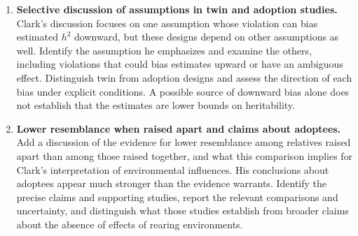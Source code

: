 \documentclass[12pt]{article}
\renewenvironment{itemize}{\begin{enumerate}}{\end{enumerate}}
\begin{document}
\begin{itemize}
from them. Preserve this distinction when assessing both contributions
and limitations.
Often Clark's conclusions do not follow from the evidence he presents.
This does not establish that the conclusions are wrong; it means they
have not been established nearly as credibly as he suggests. Develop
this distinction consistently throughout the review. Working analogy
to consider: his apparent resistance to alternative explanations recalls,
in the opposite direction, the stubbornness of Lysenkoite social
scientists who instinctively reject evidence allowing any role for
genetics. The target is asymmetric standards of evidence, not an
equivalence of substantive views. He also sometimes exaggerates how
strongly his tests discriminate between genetic and cultural models;
symmetry and regression toward the mean are key examples to document.
Examine his claims that school reforms yield no benefits, distinguishing
evidence of no benefit from failure to establish a benefit. Track shifts
between policy criteria: does a reform help anyone or improve average
outcomes, does it help the poor, does it reduce inequality, and does it
increase or reduce mobility? These are distinct questions, and a failure
on one criterion does not establish failure on the others. Collect
specific passages showing where the criterion changes within an argument.
\item \textbf{Selective discussion of assumptions in twin and adoption studies.}
Clark's discussion focuses on one assumption whose violation can bias
estimated $h^2$ downward, but these designs depend on other assumptions
as well. Identify the assumption he emphasizes and examine the others,
including violations that could bias estimates upward or have an
ambiguous effect. Distinguish twin from adoption designs and assess the
direction of each bias under explicit conditions. A possible source of
downward bias alone does not establish that the estimates are lower
bounds on heritability.
\item \textbf{Lower resemblance when raised apart and claims about adoptees.}
Add a discussion of the evidence for lower resemblance among relatives
raised apart than among those raised together, and what this comparison
implies for Clark's interpretation of environmental influences. His
conclusions about adoptees appear much stronger than the evidence
warrants. Identify the precise claims and supporting studies, report
the relevant comparisons and uncertainty, and distinguish what those
studies establish from broader claims about the absence of effects of
rearing environments.

\end{itemize}
\end{document}
